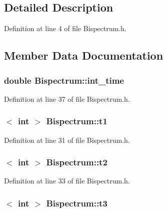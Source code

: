 \subsection{Detailed Description}


Definition at line 4 of file Bispectrum.h.



\subsection{Member Data Documentation}
\hypertarget{classBispectrum_a1f82b8ea4518fa3870102b1975282c44}{
\subsubsection[{int\_\-time}]{\setlength{\rightskip}{0pt plus 5cm}double {\bf Bispectrum::int\_\-time}}}
\label{classBispectrum_a1f82b8ea4518fa3870102b1975282c44}


Definition at line 37 of file Bispectrum.h.

\hypertarget{classBispectrum_acdc726e2151be0caed4263bfd5945d35}{
\subsubsection[{t1}]{$<$ int $>$ {\bf Bispectrum::t1}}}
\label{classBispectrum_acdc726e2151be0caed4263bfd5945d35}


Definition at line 31 of file Bispectrum.h.

\hypertarget{classBispectrum_a0fc19bc4234f4d5f5b5fff0f16a1d19a}{
\subsubsection[{t2}]{$<$ int $>$ {\bf Bispectrum::t2}}}
\label{classBispectrum_a0fc19bc4234f4d5f5b5fff0f16a1d19a}


Definition at line 33 of file Bispectrum.h.

\hypertarget{classBispectrum_a35a0c8149a0543a004044ff4ffc2eea1}{
\subsubsection[{t3}]{$<$ int $>$ {\bf Bispectrum::t3}}}
\label{classBispectrum_a35a0c8149a0543a004044ff4ffc2eea1}



